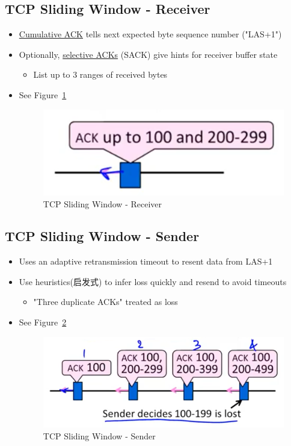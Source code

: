 \documentclass[12pt]{ctexart}   %
\begin{document}
	\subsection{TCP Sliding Window - Receiver}
	\begin{itemize}
		\item \underline{Cumulative ACK} tells next expected byte sequence number ("LAS+1")
		\item Optionally, \underline{selective ACKs} (SACK) give hints for receiver buffer state
		\begin{itemize}
			\item List up to 3 ranges of received bytes
		\end{itemize}
		\item See Figure~\ref{fig:6-8-4}
		  
		 \begin{figure}[h!] %
		\centering
		 \includegraphics[scale=0.7]{images/6-8-4}
		\caption{ TCP Sliding Window - Receiver }
		 \label{fig:6-8-4}
		 \end{figure}
	\end{itemize}
	
	\subsection{TCP Sliding Window - Sender}
	\begin{itemize}
		\item Uses an adaptive retransmission timeout to resent data from LAS+1
		\item Use heuristics(启发式) to infer loss quickly and resend to avoid timeouts
		\begin{itemize}
			\item "Three duplicate ACKs" treated as loss
		\end{itemize}
		\item See Figure~\ref{fig:6-8-5}
		  
		 \begin{figure}[h!] %
		\centering
		 \includegraphics[scale=0.7]{images/6-8-5}
		\caption{ TCP Sliding Window - Sender }
		 \label{fig:6-8-5}
		 \end{figure}
		
	\end{itemize}
	
\end{document}
